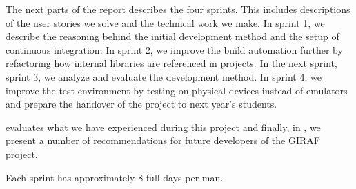 The next parts of the report describes the four sprints. This includes descriptions of the user stories we solve and the technical work we make. In sprint 1, we describe the reasoning behind the initial development method and the setup of continuous integration. In sprint 2, we improve the build automation further by refactoring how internal libraries are referenced in projects. In the next sprint, sprint 3, we analyze and evaluate the development method. In sprint 4, we improve the test environment by testing on physical devices instead of emulators  and prepare the handover of the project to next year's students.

 evaluates what we have experienced during this project and finally, in , we present a number of recommendations for future developers of the GIRAF project.


Each sprint has approximately 8 full days per man.